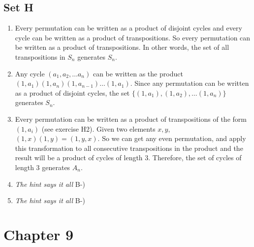 \documentclass{article}
\begin{document}
\subsection{Set H}
\begin{enumerate}
    \item Every permutation can be written as a product of disjoint cycles and every cycle can be written as a product of transpositions. So every permutation can be written as a product of transpositions. In other words, the set of all transpositions in $S_n$ generates $S_n$.

    \item Any cycle $(a_1, a_2, \ldots a_n)$ can be written as the product $(1, a_1)(1, a_n)(1, a_{n-1})\ldots(1, a_1)$. Since any permutation can be written as a product of disjoint cycles, the set $\{(1, a_1), (1, a_2), \ldots (1, a_n)\}$ generates $S_n$.

    \item Every permutation can be written as a product of transpositions of the form $(1, a_i)$ (see exercise H2). Given two elements $x, y$, $(1, x)(1, y) = (1, y, x)$. So we can get any even permutation, and apply this transformation to all consecutive transpositions in the product and the result will be a product of cycles of length 3. Therefore, the set of cycles of length 3 generates $A_n$.
 
    \item \emph{The hint says it all} B-)

    \item \emph{The hint says it all} B-)
\end{enumerate}

\section{Chapter 9}
\end{document}
